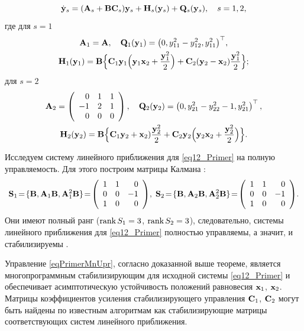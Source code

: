 \begin{example}
\begin{equation}
\dot{\bf y}_s=({\bf A}_s+{\bf B}{\bf C}_s){\bf y}_s+{\bf H}_s({\bf y}_s)+{\bf Q}_s({\bf y}_s),\quad
s=1, 2, \label{eq12_SysLinPr}
\end{equation}
где для $s=1$ 
\begin{gather*}
{\bf A}_1={\bf A}, \quad{\bf Q}_1({\bf y}_1)=\bigl(0,
y_{11}^2-y_{12}^2,  y_{11}^2 \bigr)^\top,
\\
{\bf H}_1({\bf y}_1)={\bf B}\Bigl\{{\bf C}_1{\bf y}_1\Bigl({\bf y}_1{\bf x}_2+\frac{{\bf y}_1^2}{2}\Bigr)+
{\bf C}_2({\bf y}_2-{\bf x}_2)\frac{{\bf y}^2_1}{2}\Bigr\};
\end{gather*}
для $s=2$ 
\begin{gather*}
{\bf A}_2=\left(%
\begin{array}{rrr}
  0 & 1 & 1 \\
  -1 & 2 & 1 \\
  0 & 0 & 0 \\
\end{array}%
\right),\quad{\bf Q}_2({\bf y}_2)=\left(%
  0 ,
  y_{21}^2-y_{22}^2-1 ,
  y_{21}^2 
\right)^\top,
\\
{\bf H}_2({\bf y}_2)={\bf B}\Bigl\{{\bf C}_1{\bf y}_2+{\bf x}_2)\frac{{\bf y}^2_2}{2}+
{\bf C}_2{\bf y}_2\Bigl({\bf y}_2{\bf x}_2+\frac{{\bf y}_2^2}{2}\Bigr)\Bigr\}.
\end{gather*}

Исследуем систему линейного приближения для \eqref{eq12_Primer} на
полную управляемость. Для этого построим матрицы Калмана \cite{sha:bib:5}:
$${\bf S}_1\!=\!\{{\bf B},{\bf A}_1{\bf B},{\bf A}_1^2{\bf B}\}\!=\!\left(%
\begin{array}{rrr}
1 & 1 & 0 \\
  0 & 0 & -1 \\
  1 & 0 & 0 \\
\end{array}%
\right)\!, 
\; 
{\bf S}_2\!=\!\{{\bf B},{\bf A}_2{\bf B},{\bf A}_2^2{\bf B}\}\!=\!\left(%
\begin{array}{rrr}
  1 & 1 & 0 \\
  0 & 0 & -1 \\
  1 & 0 & 0 \\
  \end{array}%
\right)\!.$$
Они имеют полный ранг ($\hbox{rank}\,S_1=3$, $\hbox{rank}\,S_2=3$),
следовательно, системы линейного приближения для
\eqref{eq12_Primer} полностью управляемы, а значит, и
стабилизируемы \cite{sha:bib:5}.

Управление \eqref{eqPrimerMnUpr}, согласно доказанной выше
теореме, является многопрограммным стабилизирующим для исходной
системы \eqref{eq12_Primer} и обеспечивает асимптотическую
устойчивость положений равновесия ${\bf x}_1$, ${\bf x}_2$. Матрицы
коэффициентов усиления стабилизирующего управления
${\bf C}_1$, ${\bf C}_2$ могут быть найдены по известным
алгоритмам \cite{sha:bib:2} как стабилизирующие матрицы соответствующих систем
линейного приближения.

\end{example}

